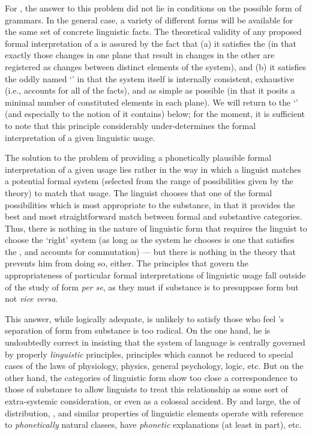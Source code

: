 For {\Hjelmslev}, the answer to this problem did not lie in conditions on
the possible form of grammars. In the general case, a variety of
different forms will be available for the same set of concrete
linguistic facts. The theoretical validity of any proposed formal
interpretation of a  is assured by the fact that (a)
it satisfies the  (in that exactly those changes in
one plane that result in changes in the other are registered as
changes between distinct elements of the system), and (b) it satisfies
the oddly named `' in that the system itself is
internally consistent, exhaustive (i.e., accounts for all of the
facts), and as simple as possible (in that it posits a minimal number
of constituted elements in each plane). We will return to the
`' (and especially to the notion of  it
contains) below; for the moment, it is sufficient to note that this
principle considerably under-determines the formal interpretation of a
given linguistic usage.

The solution to the problem of providing a phonetically plausible
formal interpretation of a given usage lies rather in the way in which
a linguist matches a potential formal system (selected from the range
of possibilities given by the theory) to match that usage. The
linguist chooses that one of the formal possibilities which is most
appropriate to the substance, in that it provides the best and most
straightforward match between formal and substantive categories. Thus,
there is nothing in the nature of linguistic form that requires the
linguist to choose the `right' system (as long as the system he
chooses is one that satisfies the , and accounts
for commutation) — but there is nothing in the theory that prevents
him from doing so, either. The principles that govern the
appropriateness of particular formal interpretations of linguistic
usage fall outside of the study of form \emph{per se}, as they must if
substance is to presuppose form but not \emph{vice versa}.

This answer, while logically adequate, is unlikely to satisfy those
who feel {\Hjelmslev}'s separation of form from substance is too
radical. On the one hand, he is undoubtedly correct in insisting that
the system of language is centrally governed by properly
\emph{linguistic} principles, principles which cannot be reduced to
special cases of the laws of physiology, physics, general psychology,
logic, etc. But on the other hand, the categories of linguistic form
show too close a correspondence to those of substance to allow
linguists to treat this relationship as some sort of extra-systemic
consideration, or even as a colossal accident. By and large, the
 of distribution, , and similar properties of
linguistic elements operate with reference to \emph{phonetically}
natural classes, have \emph{phonetic} explanations (at least in part),
etc.


